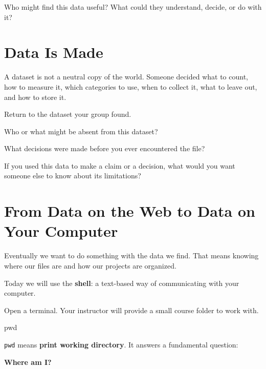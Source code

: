 \documentclass[11pt]{article}
\begin{document}
\begin{designprompt}
Who might find this data useful? What could they understand, decide, or do
with it?
\end{designprompt}

\newpage

\section{Data Is Made}

A dataset is not a neutral copy of the world. Someone decided what to count,
how to measure it, which categories to use, when to collect it, what to leave
out, and how to store it.

Return to the dataset your group found.

\limitationlabel

Who or what might be absent from this dataset?

\vspace{0.55in}

What decisions were made before you ever encountered the file?

\vspace{0.55in}

If you used this data to make a claim or a decision, what would you want
someone else to know about its limitations?

\vspace{0.55in}

\section{From Data on the Web to Data on Your Computer}

Eventually we want to do something with the data we find. That means knowing
where our files are and how our projects are organized.

Today we will use the \textbf{shell}: a text-based way of communicating with
your computer.

Open a terminal. Your instructor will provide a small course folder to work
with.

\begin{terminal}
pwd
\end{terminal}

\texttt{pwd} means \textbf{print working directory}. It answers a fundamental
question:

\begin{center}
\Large\bfseries Where am I?
\end{center}
\end{document}
